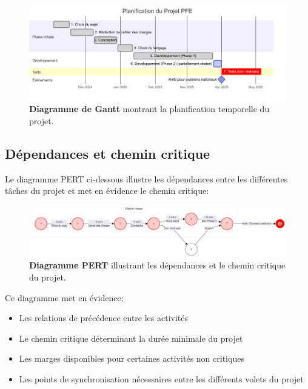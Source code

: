 \begin{figure}[H]
  \centering
  \includegraphics[width=1.0\textwidth,keepaspectratio]{pfe-pics/diagrames/Mermaid Chart - Create complex, visual diagrams with text. A smarter way of creating diagrams.-2025-06-10-203842.png}
  \caption{\textbf{Diagramme de Gantt} montrant la planification temporelle du projet.}
  \label{fig:gantt_chart}
\end{figure}

\subsection{Dépendances et chemin critique}

Le diagramme PERT ci-dessous illustre les dépendances entre les différentes tâches du projet et met en évidence le chemin critique:

\begin{figure}[H]
  \centering
  \includegraphics[width=1.0\textwidth,keepaspectratio]{pfe-pics/diagrames/Mermaid Chart - Create complex, visual diagrams with text. A smarter way of creating diagrams.-2025-06-10-203658.png}
  \caption{\textbf{Diagramme PERT} illustrant les dépendances et le chemin critique du projet.}
  \label{fig:pert_diagram}
\end{figure}

Ce diagramme met en évidence:

\begin{itemize}
  \item Les relations de précédence entre les activités
  
  \item Le chemin critique déterminant la durée minimale du projet
  
  \item Les marges disponibles pour certaines activités non critiques
  
  \item Les points de synchronisation nécessaires entre les différents volets du projet
\end{itemize}

